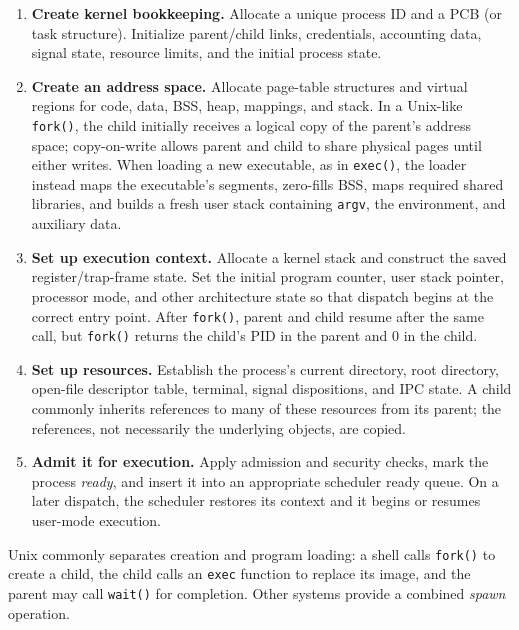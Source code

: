\begin{enumerate}
  \item \textbf{Create kernel bookkeeping.} Allocate a unique process ID and
  a PCB (or task structure).  Initialize parent/child links, credentials,
  accounting data, signal state, resource limits, and the initial process
  state.

  \item \textbf{Create an address space.} Allocate page-table structures and
  virtual regions for code, data, BSS, heap, mappings, and stack.  In a
  Unix-like \texttt{fork()}, the child initially receives a logical copy of
  the parent's address space; copy-on-write allows parent and child to share
  physical pages until either writes.  When loading a new executable, as in
  \texttt{exec()}, the loader instead maps the executable's segments,
  zero-fills BSS, maps required shared libraries, and builds a fresh user
  stack containing \texttt{argv}, the environment, and auxiliary data.

  \item \textbf{Set up execution context.} Allocate a kernel stack and
  construct the saved register/trap-frame state.  Set the initial program
  counter, user stack pointer, processor mode, and other architecture state
  so that dispatch begins at the correct entry point.  After
  \texttt{fork()}, parent and child resume after the same call, but
  \texttt{fork()} returns the child's PID in the parent and \(0\) in the
  child.

  \item \textbf{Set up resources.} Establish the process's current directory,
  root directory, open-file descriptor table, terminal, signal dispositions,
  and IPC state.  A child commonly inherits references to many of these
  resources from its parent; the references, not necessarily the underlying
  objects, are copied.

  \item \textbf{Admit it for execution.} Apply admission and security checks,
  mark the process \emph{ready}, and insert it into an appropriate scheduler
  ready queue.  On a later dispatch, the scheduler restores its context and
  it begins or resumes user-mode execution.
\end{enumerate}

Unix commonly separates creation and program loading: a shell calls
\texttt{fork()} to create a child, the child calls an \texttt{exec} function
to replace its image, and the parent may call \texttt{wait()} for completion.
Other systems provide a combined \emph{spawn} operation.

